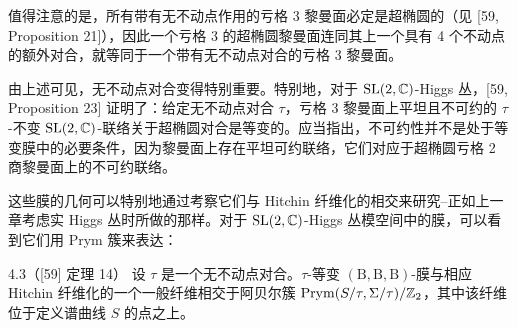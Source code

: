 值得注意的是，所有带有无不动点作用的亏格 3 黎曼面必定是超椭圆的（见 [59, Proposition 21]），因此一个亏格 3 的超椭圆黎曼面连同其上一个具有 4 个不动点的额外对合，就等同于一个带有无不动点对合的亏格 3 黎曼面。

由上述可见，无不动点对合变得特别重要。特别地，对于 $\mathrm{SL}(2,\mathbb{C})$-Higgs 丛，[59, Proposition 23] 证明了：给定无不动点对合 $\tau$，亏格 3 黎曼面上平坦且不可约的 $\tau$-不变 $\mathrm{SL}(2,\mathbb{C})$-联络关于超椭圆对合是等变的。应当指出，不可约性并不是处于等变膜中的必要条件，因为黎曼面上存在平坦可约联络，它们对应于超椭圆亏格 2 商黎曼面上的不可约联络。


这些膜的几何可以特别地通过考察它们与 Hitchin 纤维化的相交来研究--正如上一章考虑实 Higgs 丛时所做的那样。对于 $\mathrm{SL}(2,\mathbb{C})$-Higgs 丛模空间中的膜，可以看到它们用 Prym 簇来表达：

\begin{thm}{4.3（[59] 定理 14）}
设 $\tau$ 是一个无不动点对合。$\tau$-等变 $(\mathrm{B},\mathrm{B},\mathrm{B})$-膜与相应 Hitchin 纤维化的一个一般纤维相交于阿贝尔簇 $\operatorname{Prym}(S/\tau,\Sigma/\tau)/\mathbb{Z}_2$，其中该纤维位于定义谱曲线 $S$ 的点之上。
\end{thm}
